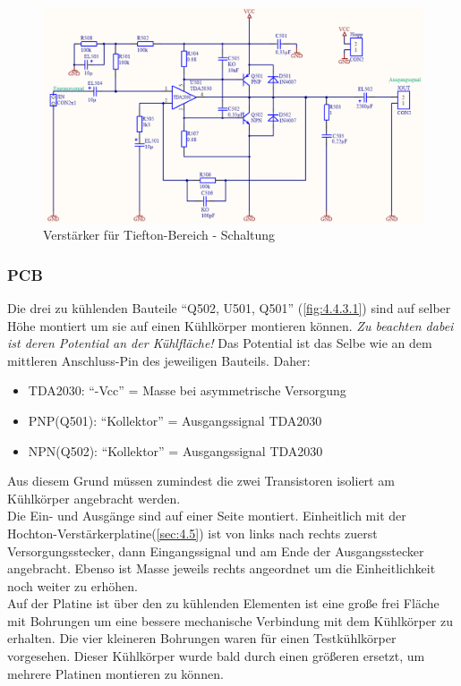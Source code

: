 \begin{figure} [H]
	\centering	
	\includegraphics[width=1\textwidth]{img/Print5/5_TTVerstaerker-Schem.PNG}
	\caption{Verstärker für Tiefton-Bereich - Schaltung}
	\label {fig:4.4.2.1}
\end{figure}

\newpage
\subsubsection{PCB}\label{subsec:4.4.3}
Die drei zu kühlenden Bauteile \enquote{Q502, U501, Q501} (\ref{fig:4.4.3.1}) sind auf selber Höhe montiert um sie auf einen Kühlkörper montieren können.
\emph{Zu beachten dabei ist deren Potential an der Kühlfläche!}
Das Potential ist das Selbe wie an dem mittleren Anschluss-Pin des jeweiligen Bauteils.
Daher:
\begin{itemize}
	\item TDA2030: \enquote{-Vcc} = Masse bei asymmetrische Versorgung
	\item PNP(Q501): \enquote{Kollektor} = Ausgangssignal TDA2030
	\item NPN(Q502): \enquote{Kollektor} = Ausgangssignal TDA2030
\end{itemize}

Aus diesem Grund müssen zumindest die zwei Transistoren isoliert am Kühlkörper angebracht werden.\\
Die Ein- und Ausgänge sind auf einer Seite montiert. 
Einheitlich mit der Hochton-Verstärkerplatine(\ref{sec:4.5}) ist von links nach rechts zuerst Versorgungsstecker, dann Eingangssignal und am Ende der Ausgangsstecker angebracht.
Ebenso ist Masse jeweils rechts angeordnet um die Einheitlichkeit noch weiter zu erhöhen.\\
Auf der Platine ist über den zu kühlenden Elementen ist eine große frei Fläche mit Bohrungen um eine bessere mechanische Verbindung mit dem Kühlkörper zu erhalten.
Die vier kleineren Bohrungen waren für einen Testkühlkörper vorgesehen. 
Dieser Kühlkörper wurde bald durch einen größeren ersetzt, um mehrere Platinen montieren zu können.

